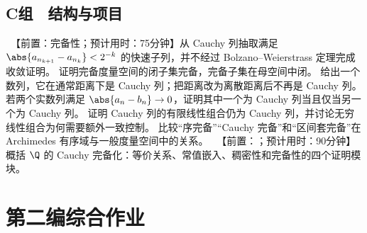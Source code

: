 \subsection*{C组　结构与项目}
\begin{enumerate}[label=\textbf{13.\arabic*.},resume]
  \projectdo\ 【前置：完备性；预计用时：75分钟】从 Cauchy 列抽取满足
 \(\abs{a_{n_{k+1}}-a_{n_k}}<2^{-k}\) 的快速子列，并不经过 Bolzano--Weierstrass 定理完成收敛证明。
  \mustdo 证明完备度量空间的闭子集完备，完备子集在母空间中闭。
  \optionaldo 给出一个数列，它在通常距离下是 Cauchy 列；把距离改为离散距离后不再是 Cauchy 列。
  \optionaldo 若两个实数列满足 \(\abs{a_n-b_n}\to0\)，证明其中一个为 Cauchy 列当且仅当另一个为 Cauchy 列。
  \optionaldo 证明 Cauchy 列的有限线性组合仍为 Cauchy 列，并讨论无穷线性组合为何需要额外一致控制。
  \opendo 比较“序完备”“Cauchy 完备”和“区间套完备”在 Archimedes 有序域与一般度量空间中的关系。
  \projectdo\ 【前置：；预计用时：90分钟】概括 \(\Q\) 的 Cauchy 完备化：等价关系、常值嵌入、稠密性和完备性的四个证明模块。
\end{enumerate}

\section*{第二编综合作业}

